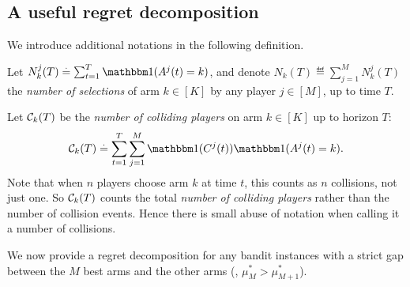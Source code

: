 \subsection{A useful regret decomposition}
\label{sub:5:defregret}

We introduce additional notations in the following definition.
%
\begin{definition}\label{def:5:nbSelections_nbCollisions}
\begin{leftbar}[defnbar]  %
  Let $N_k^j(T) \eqdef \sum_{t=1}^T \indic(A^j(t) = k)$,
  and denote $N_k(T) \eqdef \sum_{j=1}^M N_k^j(T)$ the \emph{number of selections} of arm $k\in[K]$ by any player $j\in[M]$, up to time $T$.

  Let $\mathcal{C}_k(T)$ be the \emph{number of colliding players} on arm $k\in[K]$ up to horizon $T$:
  \begin{equation}
    \cC_k(T) \eqdef
    \sum_{t=1}^{T} \sum_{j=1}^{M} \indic(C^j(t)) \indic(A^j(t) = k).
  \end{equation}
  Note that when $n$ players choose arm $k$ at time $t$, this counts as $n$ collisions, not just one. So $\mathcal{C}_k(T)$ counts the total \emph{number of colliding players} rather than the number of collision events.
  Hence there is small abuse of notation when calling it a number of collisions.
\end{leftbar}  %
\end{definition}

%
We now provide a regret decomposition for any bandit instances with a strict gap between the $M$ best arms and the other arms (\ie, $\mu_M^* > \mu_{M+1}^*$).

